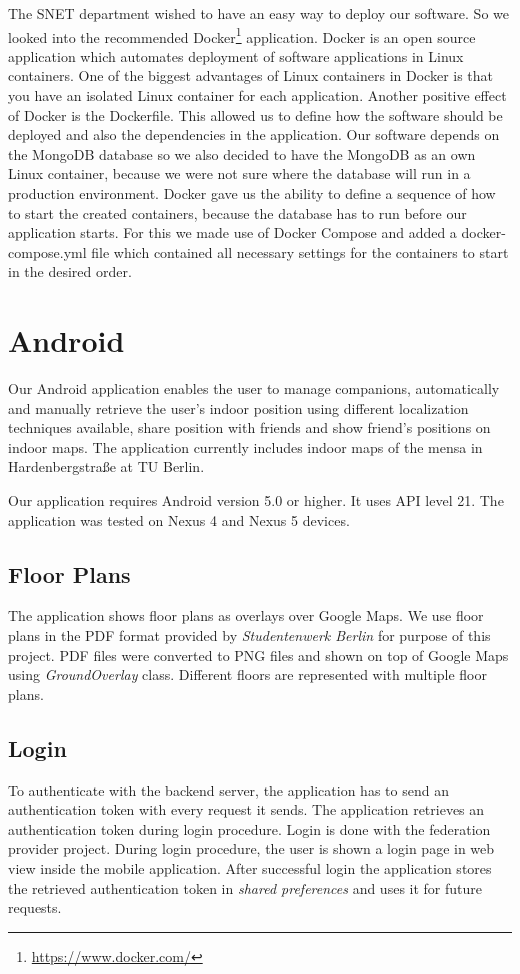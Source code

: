 The SNET department wished to have an easy way to deploy our software. So we looked into the recommended Docker\footnote{\url{https://www.docker.com/}} application. Docker is an open source application which automates deployment of software applications in Linux containers. One of the biggest advantages of Linux containers in Docker is that you have an isolated Linux container for each application. Another positive effect of Docker is the Dockerfile. This allowed us to define how the software should be deployed and also the dependencies in the application. Our software depends on the MongoDB database so we also decided to have the MongoDB as an own Linux container, because we were not sure where the database will run in a production environment. Docker gave us the ability to define a sequence of how to start the created containers, because the database has to run before our application starts. For this we made use of Docker Compose and added a docker-compose.yml file which contained all necessary settings for the containers to start in the desired order.



\vspace{0.5cm}

\section{Android}

Our Android application enables the user to manage companions, automatically and manually retrieve the user's indoor position using different localization techniques available, share position with friends and show friend's positions on indoor maps. The application currently includes indoor maps of the mensa in Hardenbergstraße at TU Berlin.

Our application requires Android version 5.0 or higher. It uses API level 21. The application was tested on Nexus 4 and Nexus 5 devices.

\subsection{Floor Plans}
The application shows floor plans as overlays over Google Maps. We use floor plans in the PDF format provided by \textit{Studentenwerk Berlin} for purpose of this project. PDF files were converted to PNG files and shown on top of Google Maps using \textit{GroundOverlay} class. Different floors are represented with multiple floor plans.

\subsection{Login}
To authenticate with the backend server, the application has to send an authentication token with every request it sends. The application retrieves an authentication token during login procedure. Login is done with the federation provider project. During login procedure, the user is shown a login page in web view inside the mobile application. After successful login the application stores the retrieved authentication token in \textit{shared preferences} and uses it for future requests.

